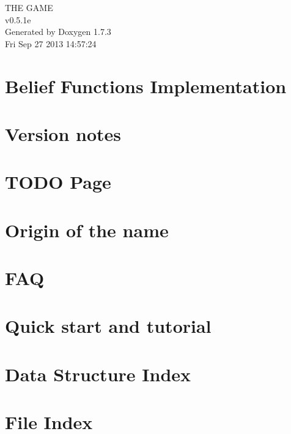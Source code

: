 \documentclass[a4paper]{book}
\begin{document}
\hypersetup{pageanchor=false}
\begin{titlepage}
\vspace*{7cm}
\begin{center}
{\Large THE GAME \\[1ex]\large v0.5.1e }\\
\vspace*{1cm}
{\large Generated by Doxygen 1.7.3}\\
\vspace*{0.5cm}
{\small Fri Sep 27 2013 14:57:24}\\
\end{center}
\end{titlepage}
\clearemptydoublepage
{}
\tableofcontents
\clearemptydoublepage
{}
\hypersetup{pageanchor=true}
\chapter{Belief Functions Implementation}
\label{index}\hypertarget{index}{}
\chapter{Version notes}
\label{version_sec}
\hypertarget{version_sec}{}

\chapter{TODO Page}
\label{TODO}
\hypertarget{TODO}{}

\chapter{Origin of the name}
\label{origin_page}
\hypertarget{origin_page}{}

\chapter{FAQ}
\label{FAQ_page}
\hypertarget{FAQ_page}{}

\chapter{Quick start and tutorial}
\label{Tuto_page}
\hypertarget{Tuto_page}{}

\chapter{Data Structure Index}

\chapter{File Index}

\end{document}
